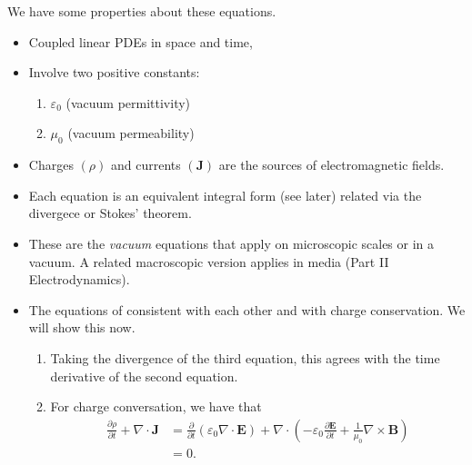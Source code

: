 \documentclass{article}
\begin{document}
\begin{remark}
  We have some properties about these equations.
  \begin{itemize}
	  \item Coupled linear PDEs in space and time,
	  \item Involve two positive constants:
		  \begin{enumerate}
			  \item $ \varepsilon_0 $ (vacuum permittivity)
			  \item $ \mu_0 $ (vacuum permeability)
		  \end{enumerate}
	  \item Charges $ (\rho) $ and currents $ (\mathbf J) $ are the sources of electromagnetic fields.
	  \item Each equation is an equivalent integral form (see later) related via the divergece or Stokes' theorem.
	  \item These are the \textit{vacuum} equations that apply on microscopic scales or in a vacuum. A related macroscopic version applies in media (Part II Electrodynamics).
	  \item The equations of consistent with each other and with charge conservation. We will show this now.
		  \begin{enumerate}
			  \item Taking the divergence of the third equation, this agrees with the time derivative of the second equation.
			  \item For charge conversation, we have that
				  \begin{align*}
					  \frac{\partial\rho}{\partial t}+\nabla\cdot\mathbf J &= \frac{\partial }{\partial t}\left(\varepsilon_0\nabla\cdot \mathbf E\right) + \nabla\cdot \left(-\varepsilon_0\frac{\partial \mathbf E}{\partial t}+\frac1{\mu_0}\nabla\times \mathbf B\right)\\
					  &= 0.
			  \end{align*}
		  \end{enumerate}
  \end{itemize}
\end{remark}
\end{document}
